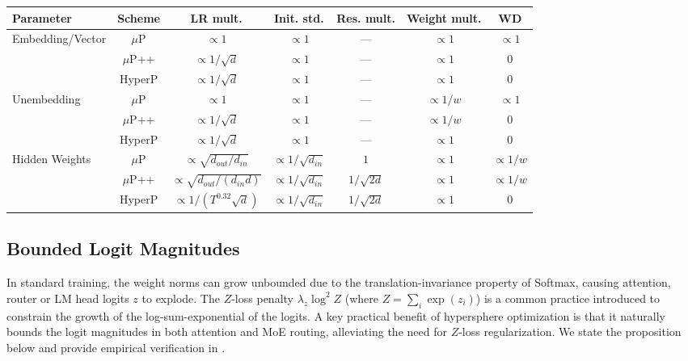 \documentclass{article}
\begin{document}
\begin{table}[htb]
\vspace{0.1cm}
\label{tab:mup-families}
\begin{tabular}{lcccccc}
\toprule
\textbf{Parameter} &
\textbf{Scheme} &
\textbf{LR mult.} &
\textbf{Init. std. } &
\textbf{Res. mult.}& \textbf{Weight mult.} & \textbf{WD} \\
\midrule
\multirow{3}{*}{Embedding/Vector}
 & $\mu$P   & $\propto1$                    &  $\propto1$                           & — & $\propto 1$ & $\propto 1$ \\
 & $\mu$P++ & $\propto 1/\sqrt{d}$                    & $\propto1$                          & — & $\propto 1$ & 0 \\
 & HyperP & $\propto 1/\sqrt{d}$                    & $\propto1$                          & — & $\propto 1$ & 0 \\
[2pt]
\midrule
\multirow{3}{*}{Unembedding}
 & $\mu$P   & $\propto 1$                    & $\propto1$                           & — &  $\propto 1/w$ & $\propto 1$ \\
 & $\mu$P++ & $\propto 1/\sqrt{d}$                    & $\propto1$                           & — &  $\propto 1/w$ & 0 \\
 & HyperP & $\propto 1/\sqrt{d}$                    & $\propto1$                           & — &  $\propto 1$ & 0 \\
[2pt]
\midrule
\multirow{3}{*}{Hidden Weights }
 & $\mu$P   & $\propto \sqrt{d_{out}/d_{in}}$                  & $\propto 1/\sqrt{d_{in}}$                              & $1$ & $\propto 1$ & $\propto 1/w$ \\
 & $\mu$P++ & $\propto \sqrt{d_{out}/(d_{in}d)}$                  & $\propto 1/\sqrt{d_{in}}$                                 & $1/\!\sqrt{2d}$ & $\propto 1$ & $\propto 1/w$\\
  & HyperP & $ \propto1/(T^{0.32}\sqrt{d})$                  & $\propto 1/\sqrt{d_{in}}$                                 & $1/\!\sqrt{2d}$ & $\propto 1$ & 0\\

\bottomrule
\end{tabular}
\vspace{-0.3cm}
\end{table}

\subsection{Bounded Logit Magnitudes}\label{sec:zloss}
In standard training, the weight norms can grow unbounded due to the translation-invariance property of Softmax, causing attention, router or LM head logits $z$ to explode. The $Z$-loss penalty $\lambda_z \log^2 Z$ (where $Z = \sum_i \exp(z_i)$) is a common practice \cite{zoph2022st0moe0} introduced to constrain the growth of the log-sum-exponential of the logits.
A key practical benefit of hypersphere optimization is that it naturally bounds the logit magnitudes in both attention and MoE routing, alleviating the need for $Z$-loss regularization. We state the proposition below and provide empirical verification in .
\end{document}

